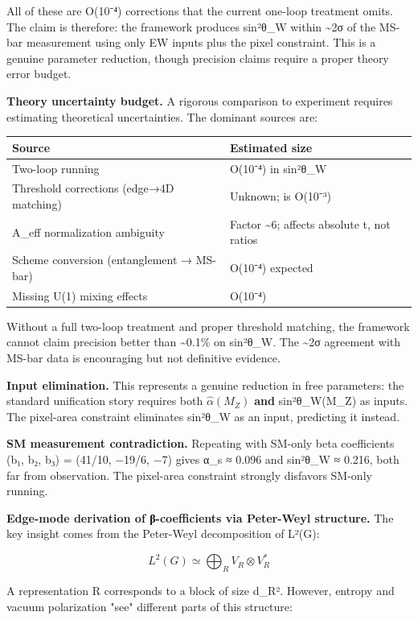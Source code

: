 All of these are O(10⁻⁴) corrections that the current one-loop treatment omits. The claim is therefore: the framework produces sin²θ\_W within \textasciitilde2σ of the MS-bar measurement using only EW inputs plus the pixel constraint. This is a genuine parameter reduction, though precision claims require a proper theory error budget.

\textbf{Theory uncertainty budget.} A rigorous comparison to experiment requires estimating theoretical uncertainties. The dominant sources are:

{\def\LTcaptype{none} %
\begin{longtable}[]{@{}ll@{}}
\toprule\noalign{}
Source & Estimated size \\
\midrule\noalign{}
\endhead
\bottomrule\noalign{}
\endlastfoot
Two-loop running & O(10⁻⁴) in sin²θ\_W \\
Threshold corrections (edge→4D matching) & Unknown; is O(10⁻³) \\
A\_eff normalization ambiguity & Factor \textasciitilde6; affects absolute t, not ratios \\
Scheme conversion (entanglement → MS-bar) & O(10⁻⁴) expected \\
Missing U(1) mixing effects & O(10⁻⁴) \\
\end{longtable}
}

Without a full two-loop treatment and proper threshold matching, the framework cannot claim precision better than \textasciitilde0.1\% on sin²θ\_W. The \textasciitilde2σ agreement with MS-bar data is encouraging but not definitive evidence.

\textbf{Input elimination.} This represents a genuine reduction in free parameters: the standard unification story requires both \(\hat{\alpha}(M_Z)\) \textbf{and} sin²θ\_W(M\_Z) as inputs. The pixel-area constraint eliminates sin²θ\_W as an input, predicting it instead.

\textbf{SM measurement contradiction.} Repeating with SM-only beta coefficients (b₁, b₂, b₃) = (41/10, −19/6, −7) gives α\_s ≈ 0.096 and sin²θ\_W ≈ 0.216, both far from observation. The pixel-area constraint strongly disfavors SM-only running.

\textbf{Edge-mode derivation of β-coefficients via Peter-Weyl structure.} The key insight comes from the Peter-Weyl decomposition of L²(G):

\[
L^2(G) \simeq \bigoplus_R V_R \otimes V_R^*
\]

A representation R corresponds to a block of size d\_R². However, entropy and vacuum polarization "see" different parts of this structure:

